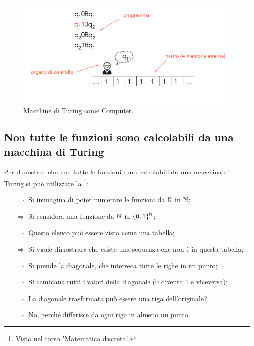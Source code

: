 \begin{figure}[h]
    \centering
    \includegraphics[scale = 0.35]{images/Turing.png}
    \caption{Macchine di Turing come Computer.}
\end{figure}




\subsection{Non tutte le funzioni sono calcolabili da una macchina di Turing}

Per dimostare che non tutte le funzioni sono calcolabili da una macchina di Turing  si può
utilizzare la \footnote{Visto nel corso "Matematica discreta".}:
\begin{itemize}
    \item [$\Rightarrow$] Si immagina di poter numerare le funzioni da $\mathbb{N}$ in $\mathbb{N}$;
    \item [$\Rightarrow$] Si considera una funzione da $\mathbb{N}$ in $\{0,1\}^{\mathbb{N}}$;
    \item [$\Rightarrow$] Questo elenco può essere visto come una tabella;
    \item [$\Rightarrow$] Si vuole dimostrare che esiste una sequenza che non è in questa tabella;
    \item [$\Rightarrow$] Si prende la diagonale, che interseca tutte le righe in un punto;
    \item [$\Rightarrow$] Si cambiano tutti i valori della diagonale (0 diventa 1 e viceversa);
    \item [$\Rightarrow$] La diagonale trasformata può essere una riga dell'originale?
    \item [$\Rightarrow$] No, perché differisce da ogni riga in almeno un punto.
\end{itemize}

